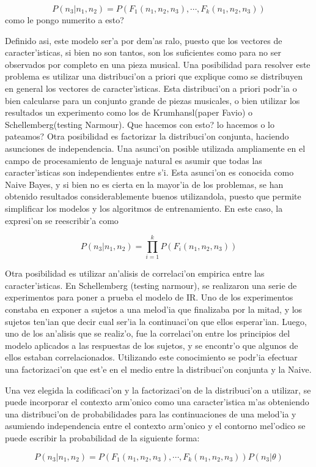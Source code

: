 $$P(n_3 | n_1, n_2) = P(F_1(n_1, n_2, n_3), \cdots, F_k(n_1, n_2, n_3))$$\alert{como le pongo numerito a esto?}

Definido asi, este modelo ser'a por dem'as ralo, puesto que los vectores de caracter'isticas, si bien no son tantos, son los suficientes como para no ser observados
por completo en una pieza musical. Una posibilidad para resolver este problema es utilizar una distribuci'on a priori que explique como se distribuyen en general
los vectores de caracter'isticas. Esta distribuci'on a priori podr'ia o bien calcularse para un conjunto grande de piezas musicales, o bien utilizar los resultados 
un experimento como los de Krumhansl(\cita paper Favio) o Schellemberg(\cita testing Narmour). \alert{Que hacemos con esto? lo hacemos o lo pateamos?} 
Otra posibilidad es factorizar la distribuci'on conjunta, haciendo asunciones de independencia. Una asunci'on posible utilizada ampliamente en el campo 
de procesamiento de lenguaje natural es asumir que todas las caracter'isticas son independientes entre s'i. Esta asunci'on es conocida como Naive Bayes, y
si bien no es cierta en la mayor'ia de los problemas, se han obtenido resultados considerablemente buenos utilizandola, puesto que permite simplificar
los modelos y los algoritmos de entrenamiento. En este caso, la expresi'on  se reescribir'a como

$$P(n_3 | n_1, n_2) = \prod_{i=1}^k P(F_i(n_1, n_2, n_3))$$

Otra posibilidad es utilizar an'alisis de correlaci'on empirica entre las caracter'isticas. En Schellemberg (\cita testing narmour), se realizaron una serie
de experimentos para poner a prueba el modelo de IR. Uno de los experimentos constaba en exponer a sujetos a una melod'ia que finalizaba por la mitad, y los sujetos
ten'ian que decir cual ser'ia la continuaci'on que ellos esperar'ian. Luego, uno de los an'alisis que se realiz'o, fue la correlaci'on entre los principios del modelo
aplicados a las respuestas de los sujetos, y se encontr'o que algunos de ellos estaban correlacionados. Utilizando este conocimiento se podr'ia efectuar
una factorizaci'on que est'e en el medio entre la distribuci'on conjunta y la Naive.

Una vez elegida la codificaci'on y la factorizaci'on de la distribuci'on a utilizar, se puede incorporar el contexto arm'onico como una caracter'istica m'as 
obteniendo una distribuci'on de probabilidades para las continuaciones de una melod'ia y asumiendo independencia entre el contexto arm'onico y el contorno mel'odico
se puede escribir la probabilidad de la siguiente forma:

$$P(n_3 | n_1, n_2) = P(F_1(n_1, n_2, n_3), \cdots, F_k(n_1, n_2, n_3)) P(n_3|\theta)$$
